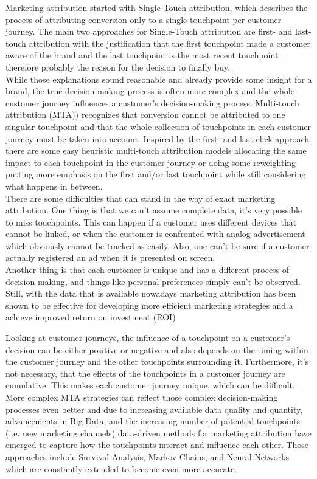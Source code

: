 Marketing attribution started with Single-Touch attribution, which describes the process of attributing conversion only to a single touchpoint per customer journey. 
The main two approaches for Single-Touch attribution are first- and last-touch attribution with the justification that the first touchpoint made a customer aware of the brand and the last touchpoint is the most recent touchpoint therefore probably the reason for the decision to finally buy. \\
While those explanations sound reasonable and already provide some insight for a brand, the true decision-making process is often more complex and the whole customer journey influences a customer's decision-making process. 
Multi-touch attribution (MTA)) recognizes that conversion cannot be attributed to one singular touchpoint and that the whole collection of touchpoints in each customer journey must be taken into account. Inspired by the first- and last-click approach there are some easy heuristic multi-touch attribution models allocating the same impact to each touchpoint in the customer journey or doing some reweighting putting more emphasis on the first and/or last touchpoint while still considering what happens in between. \\
There are some difficulties that can stand in the way of exact marketing attribution. One thing is that we can't assume complete data, it's very possible to miss touchpoints. This can happen if a customer uses different devices that cannot be linked, or when the customer is confronted with analog advertisement which obviously cannot be tracked as easily. Also, one can't be sure if a customer actually registered an ad when it is presented on screen.\\
Another thing is that each customer is unique and has a different process of decision-making, and things like personal preferences simply can't be observed. \\
\color{red}Still, with the data that is available nowadays marketing attribution has been shown to be effective for developing more efficient marketing strategies and a achieve improved return on investment (ROI)  \cite {there is a source for this}  \color{black}

Looking at customer journeys, the influence of a touchpoint on a customer's decision can be either positive or negative and also depends on the timing within the customer journey and the other touchpoints surrounding it. 
Furthermore, it's not necessary, that the effects of the touchpoints in a customer journey are cumulative.  This makes each customer journey unique, which can be difficult. \\
More complex MTA strategies can reflect those complex decision-making processes even better and due to increasing available data quality and quantity, advancements in Big Data, and the increasing number of potential touchpoints (i.e. new marketing channels) data-driven methods for marketing attribution have emerged to capture how the touchpoints interact and influence each other. 
Those approaches include Survival Analysis, Markov Chains, and Neural Networks which are constantly extended to become even more accurate.\\ 

